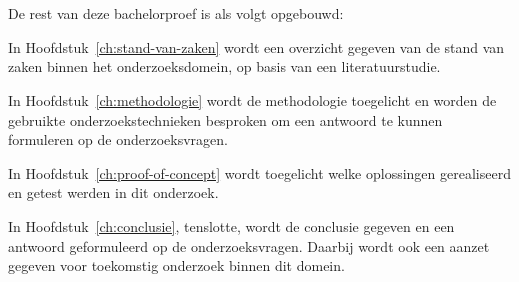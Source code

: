 \section{}%
\label{sec:opzet-bachelorproef}


De rest van deze bachelorproef is als volgt opgebouwd:

In Hoofdstuk~\ref{ch:stand-van-zaken} wordt een overzicht gegeven van de stand van zaken binnen het onderzoeksdomein, op basis van een literatuurstudie.

In Hoofdstuk~\ref{ch:methodologie} wordt de methodologie toegelicht en worden de gebruikte onderzoekstechnieken besproken om een antwoord te kunnen formuleren op de onderzoeksvragen.

In Hoofdstuk~\ref{ch:proof-of-concept} wordt toegelicht welke oplossingen gerealiseerd en getest werden in dit onderzoek. 

In Hoofdstuk~\ref{ch:conclusie}, tenslotte, wordt de conclusie gegeven en een antwoord geformuleerd op de onderzoeksvragen. Daarbij wordt ook een aanzet gegeven voor toekomstig onderzoek binnen dit domein.